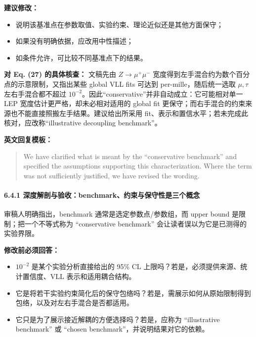 \documentclass[
]{article}
\providecommand{\tightlist}{%
  \setlength{\itemsep}{0pt}\setlength{\parskip}{0pt}}
\begin{document}
\textbf{建议修改：}

\begin{itemize}
\tightlist
\item
  说明该基准点在参数取值、实验约束、理论近似还是其他方面保守；
\item
  如果没有明确依据，应改用中性描述；
\item
  如条件允许，可比较不同基准点下的结果。
\end{itemize}

\textbf{对 Eq. (27) 的具体核查：} 文稿先由 \(Z\to\mu^+\mu^-\)
宽度得到左手混合约为数个百分点的示意限制，又指出某些 global VLL fits
可达到 per-mille，随后统一选取 \(\mu,\tau\) 左右手混合都不超过
\(10^{-2}\)。因此``conservative''并非自动成立：它可能相对单一 LEP
宽度估计更严格，却未必相对适用的 global fit
更保守；而右手混合的约束来源也不能直接照搬左手结果。建议给出所采用
fit、表示和置信水平；若未完成此核对，应改称``illustrative decoupling
benchmark''。

\textbf{英文回复模板：}

\begin{quote}
We have clarified what is meant by the ``conservative benchmark'' and
specified the assumptions supporting this characterization. Where the
term was not sufficiently justified, we have revised the wording.
\end{quote}

\paragraph{6.4.1
深度解剖与验收：benchmark、约束与保守性是三个概念}\label{ux6df1ux5ea6ux89e3ux5256ux4e0eux9a8cux6536benchmarkux7ea6ux675fux4e0eux4fddux5b88ux6027ux662fux4e09ux4e2aux6982ux5ff5}

审稿人明确指出，benchmark 通常是选定参数点/参数组，而 upper bound
是限制；把一个不等式称为 ``conservative benchmark''
会让读者误以为它是已测得的实验界限。

\textbf{修改前必须回答：}

\begin{itemize}
\tightlist
\item
  \(10^{-2}\) 是某个实验分析直接给出的 95\% CL
  上限吗？若是，必须提供来源、统计置信度、VLL 表示和适用耦合结构。
\item
  它是将若干实验约束简化后的保守包络吗？若是，需展示如何从原始限制得到包络，以及对左右手混合是否都适用。
\item
  它只是为了展示接近解耦的方便选择吗？若是，应称为 ``illustrative
  benchmark'' 或 ``chosen benchmark''，并说明结果对它的依赖。
\end{itemize}
\end{document}
